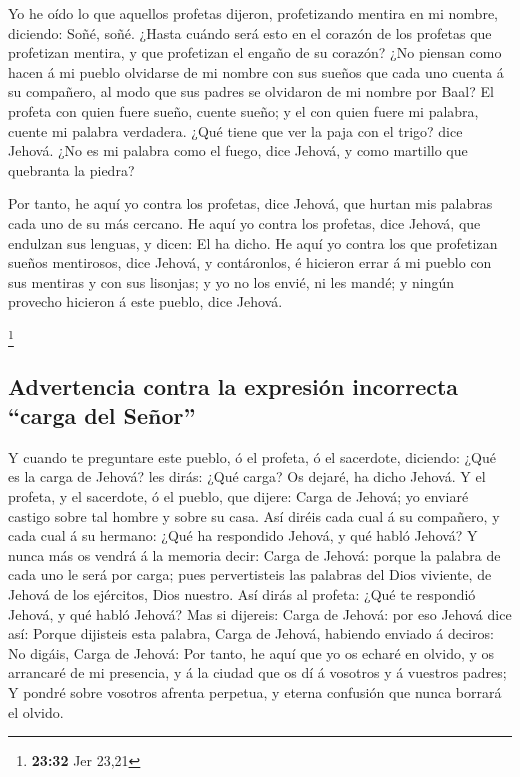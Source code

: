  Yo he oído lo que aquellos profetas dijeron,
profetizando mentira en mi nombre, diciendo: Soñé, soñé. 
¿Hasta cuándo será esto en el corazón de los profetas que profetizan
mentira, y que profetizan el engaño de su corazón?  ¿No
piensan como hacen á mi pueblo olvidarse de mi nombre con sus sueños que
cada uno cuenta á su compañero, al modo que sus padres se olvidaron de
mi nombre por Baal?  El profeta con quien fuere sueño,
cuente sueño; y el con quien fuere mi palabra, cuente mi palabra
verdadera. ¿Qué tiene que ver la paja con el trigo? dice Jehová.
 ¿No es mi palabra como el fuego, dice Jehová, y como
martillo que quebranta la piedra?

 Por tanto, he aquí yo contra los profetas, dice Jehová,
que hurtan mis palabras cada uno de su más cercano.  He
aquí yo contra los profetas, dice Jehová, que endulzan sus lenguas, y
dicen: El ha dicho.  He aquí yo contra los que profetizan
sueños mentirosos, dice Jehová, y contáronlos, é hicieron errar á mi
pueblo con sus mentiras y con sus lisonjas; y yo no los envié, ni les
mandé; y ningún provecho hicieron á este pueblo, dice Jehová.

\footnote{\textbf{23:32} Jer 23,21}

\hypertarget{advertencia-contra-la-expresiuxf3n-incorrecta-carga-del-seuxf1or}{%
\subsection{Advertencia contra la expresión incorrecta ``carga del
Señor''}\label{advertencia-contra-la-expresiuxf3n-incorrecta-carga-del-seuxf1or}}

 Y cuando te preguntare este pueblo, ó el profeta, ó el
sacerdote, diciendo: ¿Qué es la carga de Jehová? les dirás: ¿Qué carga?
Os dejaré, ha dicho Jehová.  Y el profeta, y el
sacerdote, ó el pueblo, que dijere: Carga de Jehová; yo enviaré castigo
sobre tal hombre y sobre su casa.  Así diréis cada cual á
su compañero, y cada cual á su hermano: ¿Qué ha respondido Jehová, y qué
habló Jehová?  Y nunca más os vendrá á la memoria decir:
Carga de Jehová: porque la palabra de cada uno le será por carga; pues
pervertisteis las palabras del Dios viviente, de Jehová de los
ejércitos, Dios nuestro.  Así dirás al profeta: ¿Qué te
respondió Jehová, y qué habló Jehová?  Mas si dijereis:
Carga de Jehová: por eso Jehová dice así: Porque dijisteis esta palabra,
Carga de Jehová, habiendo enviado á deciros: No digáis, Carga de Jehová:
 Por tanto, he aquí que yo os echaré en olvido, y os
arrancaré de mi presencia, y á la ciudad que os dí á vosotros y á
vuestros padres;  Y pondré sobre vosotros afrenta
perpetua, y eterna confusión que nunca borrará el olvido.

